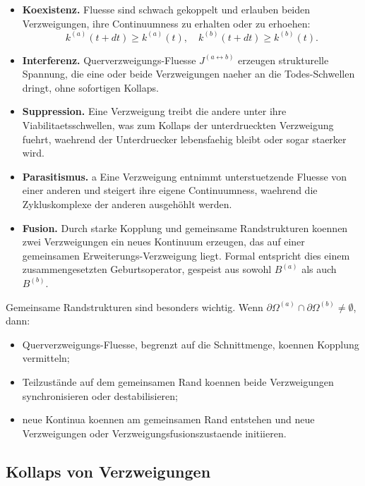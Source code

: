 \begin{itemize}
  \item \textbf{Koexistenz.}\quad
        Fluesse sind schwach gekoppelt und erlauben beiden Verzweigungen, ihre
        Continuumness zu erhalten oder zu erhoehen:
        \[
          k^{(a)}(t+dt) \ge k^{(a)}(t),\quad
          k^{(b)}(t+dt) \ge k^{(b)}(t).
        \]
  \item \textbf{Interferenz.}\quad
        Querverzweigungs-Fluesse \(J^{(a\leftrightarrow b)}\) erzeugen
        strukturelle Spannung, die eine oder beide Verzweigungen naeher an die
        Todes-Schwellen dringt, ohne sofortigen Kollaps.
  \item \textbf{Suppression.}\quad
        Eine Verzweigung treibt die andere unter ihre Viabilitaetsschwellen,
        was zum Kollaps der unterdrueckten Verzweigung fuehrt, waehrend der
        Unterdruecker lebensfaehig bleibt oder sogar staerker wird.
  \item \textbf{Parasitismus.}\quad
a
        Eine Verzweigung entnimmt unterstuetzende Fluesse von einer anderen und
        steigert ihre eigene Continuumness, waehrend die Zykluskomplexe der
        anderen ausgehöhlt werden.
  \item \textbf{Fusion.}\quad
        Durch starke Kopplung und gemeinsame Randstrukturen koennen zwei
        Verzweigungen ein neues Kontinuum erzeugen, das auf einer gemeinsamen
        Erweiterungs-Verzweigung liegt. Formal entspricht dies einem
        zusammengesetzten Geburtsoperator, gespeist aus sowohl \(B^{(a)}\) als auch
        \(B^{(b)}\).
\end{itemize}

Gemeinsame Randstrukturen sind besonders wichtig. Wenn
\(\partial\Omega^{(a)}\cap\partial\Omega^{(b)}\neq\emptyset\), dann:
\begin{itemize}
  \item Querverzweigungs-Fluesse, begrenzt auf die Schnittmenge, koennen
        Kopplung vermitteln;
  \item Teilzustände auf dem gemeinsamen Rand koennen beide Verzweigungen
        synchronisieren oder destabilisieren;
  \item neue Kontinua koennen am gemeinsamen Rand entstehen und neue
        Verzweigungen oder Verzweigungsfusionszustaende initiieren.
\end{itemize}

\subsection{Kollaps von Verzweigungen}

